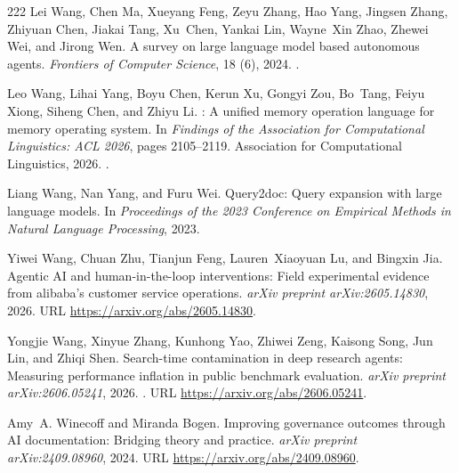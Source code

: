 \begin{thebibliography}{222}
Lei Wang, Chen Ma, Xueyang Feng, Zeyu Zhang, Hao Yang, Jingsen Zhang, Zhiyuan
  Chen, Jiakai Tang, Xu~Chen, Yankai Lin, Wayne~Xin Zhao, Zhewei Wei, and
  Jirong Wen.
\newblock A survey on large language model based autonomous agents.
\newblock \emph{Frontiers of Computer Science}, 18 (6),
  2024{}.
\newblock {}.

Leo Wang, Lihai Yang, Boyu Chen, Kerun Xu, Gongyi Zou, Bo~Tang, Feiyu Xiong,
  Siheng Chen, and Zhiyu Li.
: A unified memory operation language for memory operating
  system.
\newblock In \emph{Findings of the Association for Computational Linguistics:
  ACL 2026}, pages 2105--2119. Association for Computational Linguistics,
  2026{}.
\newblock {}.

Liang Wang, Nan Yang, and Furu Wei.
\newblock Query2doc: Query expansion with large language models.
\newblock In \emph{Proceedings of the 2023 Conference on Empirical Methods in
  Natural Language Processing}, 2023{}.

Yiwei Wang, Chuan Zhu, Tianjun Feng, Lauren~Xiaoyuan Lu, and Bingxin Jia.
\newblock Agentic {AI} and human-in-the-loop interventions: Field experimental
  evidence from alibaba's customer service operations.
\newblock \emph{arXiv preprint arXiv:2605.14830}, 2026{}.
\newblock URL \url{https://arxiv.org/abs/2605.14830}.

Yongjie Wang, Xinyue Zhang, Kunhong Yao, Zhiwei Zeng, Kaisong Song, Jun Lin,
  and Zhiqi Shen.
\newblock Search-time contamination in deep research agents: Measuring
  performance inflation in public benchmark evaluation.
\newblock \emph{arXiv preprint arXiv:2606.05241}, 2026{}.
\newblock {}.
\newblock URL \url{https://arxiv.org/abs/2606.05241}.

Amy~A. Winecoff and Miranda Bogen.
\newblock Improving governance outcomes through {AI} documentation: Bridging
  theory and practice.
\newblock \emph{arXiv preprint arXiv:2409.08960}, 2024.
\newblock URL \url{https://arxiv.org/abs/2409.08960}.


\end{thebibliography}
